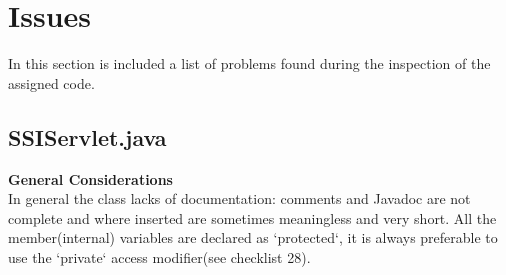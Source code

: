 \documentclass[11pt,titlepage]{article} %
\begin{document}
\section{Issues}
In this section is included a list of problems found during the inspection of the assigned code.
\subsection{SSIServlet.java}
  \textbf{General Considerations} \hfill \\
  In general the class lacks of documentation: comments and Javadoc are not complete and where inserted are sometimes meaningless and very short.\newline
  All the member(internal) variables are declared as `protected`, it is always preferable to use the `private` access modifier(see checklist 28). 
\end{document}
